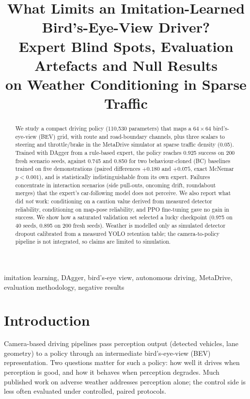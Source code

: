 \documentclass[conference]{IEEEtran}
\begin{document}
\title{What Limits an Imitation-Learned Bird's-Eye-View Driver?\\
Expert Blind Spots, Evaluation Artefacts and Null Results\\
on Weather Conditioning in Sparse Traffic}

\author{
}

\maketitle

\begin{abstract}
We study a compact driving policy (110{,}530 parameters) that maps a $64{\times}64$ bird's-eye-view (BEV) grid, with route and road-boundary channels, plus three scalars to steering and throttle/brake in the MetaDrive simulator at sparse traffic density (0.05). Trained with DAgger from a rule-based expert, the policy reaches 0.925 success on 200 fresh scenario seeds, against 0.745 and 0.850 for two behaviour-cloned (BC) baselines trained on five demonstrations (paired differences $+0.180$ and $+0.075$, exact McNemar $p<0.001$), and is statistically indistinguishable from its own expert. Failures concentrate in interaction scenarios (side pull-outs, oncoming drift, roundabout merges) that the expert's car-following model does not perceive. We also report what did \emph{not} work: conditioning on a caution value derived from measured detector reliability, conditioning on map-pose reliability, and PPO fine-tuning gave no gain in success. We show how a saturated validation set selected a lucky checkpoint (0.975 on 40 seeds, 0.895 on 200 fresh seeds). Weather is modelled only as simulated detector dropout calibrated from a measured YOLO retention table; the camera-to-policy pipeline is not integrated, so claims are limited to simulation.
\end{abstract}

\begin{IEEEkeywords}
imitation learning, DAgger, bird's-eye view, autonomous driving, MetaDrive, evaluation methodology, negative results
\end{IEEEkeywords}

\section{Introduction}
Camera-based driving pipelines pass perception output (detected vehicles, lane geometry) to a policy through an intermediate bird's-eye-view (BEV) representation. Two questions matter for such a policy: how well it drives when perception is good, and how it behaves when perception degrades. Much published work on adverse weather addresses perception alone; the control side is less often evaluated under controlled, paired protocols.
\end{document}
